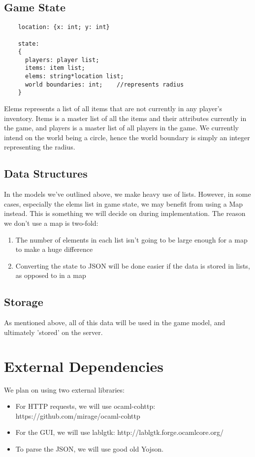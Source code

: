 \documentclass{article}
\begin{document}
	\subsection{Game State}
	\begin{verbatim}
	location: {x: int; y: int}
	
	state:
	{
	  players: player list;
	  items: item list;
	  elems: string*location list;
	  world boundaries: int;	//represents radius
	}
	\end{verbatim}
	Elems represents a list of all items that are not currently in any player's inventory. Items is a master list of all the items and their attributes currently in the game, and players is a master list of all players in the game. We currently intend on the world being a circle, hence the world boundary is simply an integer representing the radius.
    
    \subsection{Data Structures}
    In the models we've outlined above, we make heavy use of lists. However, in some cases, especially the elems list in game state, we may benefit from using a Map instead. This is something we will decide on during implementation. The reason we don't use a map is two-fold:
    \begin{enumerate}
    	\item The number of elements in each list isn't going to be large enough for a map to make a huge difference
	\item Converting the state to JSON will be done easier if the data is stored in lists, as opposed to in a map	
    \end{enumerate}
    
    \subsection{Storage}
    As mentioned above, all of this data will be used in the game model, and ultimately 'stored' on the server.
    
    \section{External Dependencies}
    We plan on using two external libraries:
    \begin{itemize}
   	 \item For HTTP requests, we will use ocaml-cohttp: https://github.com/mirage/ocaml-cohttp
    	\item For the GUI, we will use lablgtk: http://lablgtk.forge.ocamlcore.org/ 
	\item To parse the JSON, we will use good old Yojson.
    \end{itemize}   
\end{document}
